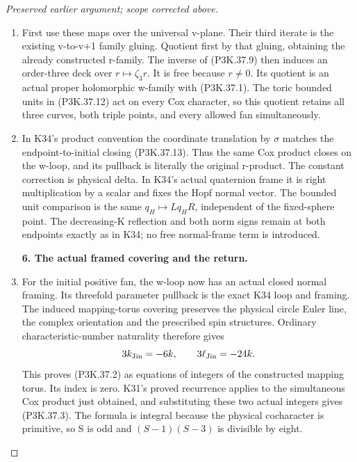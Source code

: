 \begin{proof}[Preserved earlier argument; scope corrected above]
\begin{enumerate}[label=\arabic*.]
\item First use these maps over the universal v-plane. Their third iterate is
the existing v-to-v+1 family gluing. Quotient first by that gluing, obtaining
the already constructed r-family. The inverse of (P3K.37.9) then induces an
order-three deck over \(r\mapsto\zeta_3r\). It is free because
\(r\ne0\). Its quotient is an actual proper holomorphic w-family with
(P3K.37.1). The toric bounded units in (P3K.37.12) act on every Cox character,
so this quotient retains all three curves, both triple points, and every
allowed fan simultaneously.

\item In K34's product convention the coordinate translation by \(\sigma\)
matches the endpoint-to-initial closing (P3K.37.13). Thus the same Cox product
closes on the w-loop, and its pullback is literally the original r-product.
The constant correction is physical delta. In K34's actual quaternion frame
it is right multiplication by a scalar and fixes the Hopf normal vector.
The bounded unit comparison is the same \(q_H\mapsto Lq_HR\),
independent of the fixed-sphere point. The decreasing-K reflection and both
norm signs remain at both endpoints exactly as in K34; no free normal-frame
term is introduced.

\par\medskip\noindent\textbf{6. The actual framed covering and the return.}\enspace

\item For the initial positive fan, the w-loop now has an actual closed normal
framing. Its threefold parameter pullback is the exact K34 loop and framing.
The induced mapping-torus covering preserves the physical circle Euler line,
the complex orientation and the prescribed spin structures. Ordinary
characteristic-number naturality therefore gives
\[
 3k_{\rm Jin}=-6k,\qquad 3\ell_{\rm Jin}=-24k.
\]
This proves (P3K.37.2) as equations of integers of the constructed mapping torus.
Its index is zero. K31's proved recurrence applies to the simultaneous Cox
product just obtained, and substituting these two actual integers gives
(P3K.37.3). The formula is integral because the physical cocharacter is primitive,
so S is odd and \((S-1)(S-3)\) is divisible by eight.


\end{enumerate}
\end{proof}
